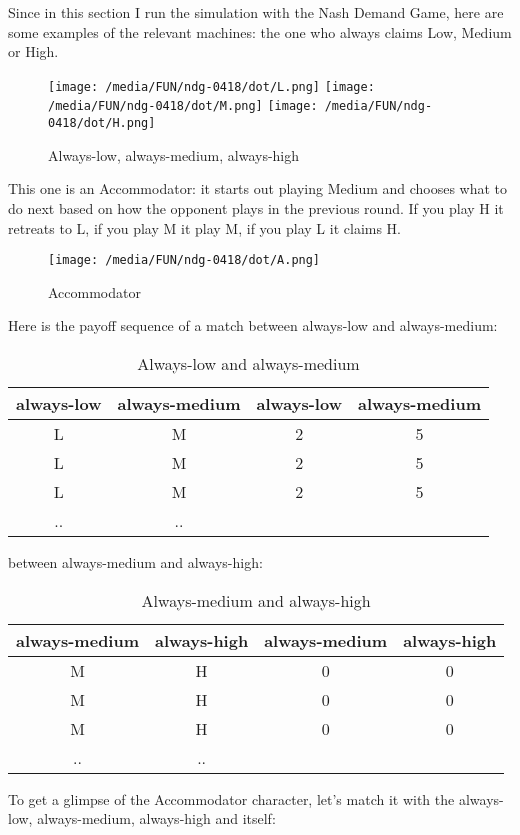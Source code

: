 \documentclass[12.5pt]{report}
\begin{document}
Since in this section I run the simulation with the Nash Demand Game, here are some examples of the relevant machines: the one who always claims Low, Medium or High.

\begin{figure}[h!]
\center
\texttt{[image: /media/FUN/ndg-0418/dot/L.png]}
\texttt{[image: /media/FUN/ndg-0418/dot/M.png]}
\texttt{[image: /media/FUN/ndg-0418/dot/H.png]}
\caption{Always-low, always-medium, always-high}
\end{figure}

This one is an Accommodator: it starts out playing Medium and chooses what to do next based on how the opponent plays in the previous round. If you play H it retreats to L, if you play M it play M, if you play L it claims H.

\begin{figure}[h!]
\center
\texttt{[image: /media/FUN/ndg-0418/dot/A.png]}
\caption{Accommodator}
\end{figure}

Here is the payoff sequence of a match between always-low and always-medium:
\begin{table}[h!]
\center
\begin{tabular}{cc|cc}
always-low & always-medium & always-low & always-medium\\
\hline
L & M & 2 & 5 \\
L & M & 2 & 5 \\
L & M & 2 & 5 \\
.. & ..\\
\end{tabular}
\caption{Always-low and always-medium}
\end{table}

between always-medium and always-high:
\begin{table}[h!]
\center
\begin{tabular}{cc|cc}
always-medium & always-high & always-medium & always-high\\
\hline
M & H & 0 & 0 \\
M & H & 0 & 0 \\
M & H & 0 & 0 \\
.. & ..\\
\end{tabular}
\caption{Always-medium and always-high}
\end{table}


To get a glimpse of the Accommodator character, let's match it with the always-low, always-medium, always-high and itself:
\end{document}
